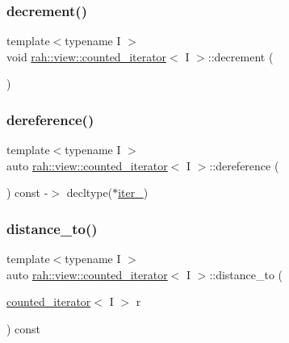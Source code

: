 \subsubsection{\texorpdfstring{decrement()}{decrement()}}
{\footnotesize\ttfamily template$<$typename I $>$ \\
void \mbox{\hyperlink{structrah_1_1view_1_1counted__iterator}{rah\+::view\+::counted\+\_\+iterator}}$<$ I $>$\+::decrement (\begin{DoxyParamCaption}{ }\end{DoxyParamCaption})\hspace{0.3cm}{\ttfamily [inline]}}

\mbox{\label{structrah_1_1view_1_1counted__iterator_aa0478a9f3d2083f2cd9c42d32e8e4dd5}} 
\subsubsection{\texorpdfstring{dereference()}{dereference()}}
{\footnotesize\ttfamily template$<$typename I $>$ \\
auto \mbox{\hyperlink{structrah_1_1view_1_1counted__iterator}{rah\+::view\+::counted\+\_\+iterator}}$<$ I $>$\+::dereference (\begin{DoxyParamCaption}{ }\end{DoxyParamCaption}) const -\/$>$ decltype($\ast$\mbox{\hyperlink{structrah_1_1view_1_1counted__iterator_a907dba6ac64293e4c5718e522da4972e}{iter\+\_\+}}) \hspace{0.3cm}{\ttfamily [inline]}}

\mbox{\label{structrah_1_1view_1_1counted__iterator_afee4b1d8525979cc4b711eba9b524f1d}} 
\subsubsection{\texorpdfstring{distance\_to()}{distance\_to()}}
{\footnotesize\ttfamily template$<$typename I $>$ \\
auto \mbox{\hyperlink{structrah_1_1view_1_1counted__iterator}{rah\+::view\+::counted\+\_\+iterator}}$<$ I $>$\+::distance\+\_\+to (\begin{DoxyParamCaption}\item[{\mbox{\hyperlink{structrah_1_1view_1_1counted__iterator}{counted\+\_\+iterator}}$<$ I $>$}]{r }\end{DoxyParamCaption}) const\hspace{0.3cm}{\ttfamily [inline]}}

